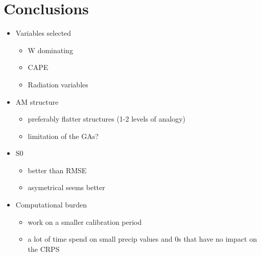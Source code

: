 \documentclass[draft]{agujournal2019}
\begin{document}
\section{Conclusions}
\label{conclusions}


\begin{itemize}
	\item Variables selected
	\begin{itemize}
		\item W dominating
		\item CAPE
		\item Radiation variables
	\end{itemize}
	\item AM structure
	\begin{itemize}
		\item preferably flatter structures (1-2 levels of analogy)
		\item limitation of the GAs?
	\end{itemize}
	\item S0
	\begin{itemize}
		\item better than RMSE
		\item asymetrical seems better
	\end{itemize}
	\item Computational burden
	\begin{itemize}
		\item work on a smaller calibration period
		\item a lot of time spend on small precip values and 0s that have no impact on the CRPS
	\end{itemize}
\end{itemize}


%
%
%
%
%
%
%
%
%
%
\end{document}
